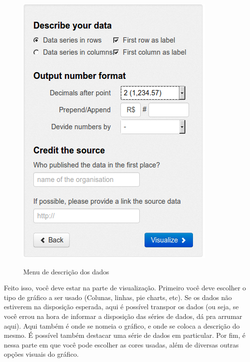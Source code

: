 \documentclass[12pt,onecolumn]{article}
\begin{document}
    \begin{figure}[H]
      \begin{center}
        \includegraphics[scale = 0.5]{datawrapper-describe.png}
        \label{fig:datawrapper-describe}
        \caption{Menu de descrição dos dados}
      \end{center}
    \end{figure}
    
    Feito isso, você deve estar na parte de visualização. Primeiro você deve escolher
    o tipo de gráfico a ser usado (Colunas, linhas, pie charts, etc). Se os dados não
    estiverem na disposição esperada, aqui é possível transpor os dados (ou seja, se
    você errou na hora de informar a disposição das séries de dados, dá pra arrumar 
    aqui). Aqui também é onde se nomeia o gráfico, e onde se coloca a descrição do
    mesmo. É possível também destacar uma série de dados em particular. Por fim, 
    é nessa parte em que você pode escolher as cores usadas, além de diversas outras
    opções visuais do gráfico.
    
\end{document}
